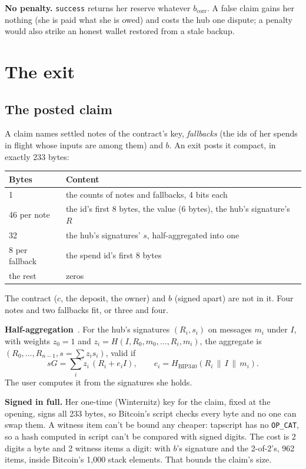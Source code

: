 \documentclass[11pt]{article}
\newcommand{\bcorr}{b_{\mathrm{corr}}}
\newcommand{\tx}[1]{\texttt{#1}}
\begin{document}
\textbf{No penalty.} \tx{success} returns her reserve whatever
$\bcorr$. A false claim gains her nothing (she is paid what she is
owed) and costs the hub one dispute; a penalty would also strike an
honest wallet restored from a stale backup.

\section{The exit}\label{sec:exit}

\subsection{The posted claim}\label{sec:claim}

A claim names settled notes of the contract's key, \emph{fallbacks}
(the ids of her spends in flight whose inputs are among them) and $b$.
An exit posts it compact, in exactly 233 bytes:

\begin{center}
\begin{tabularx}{0.9\linewidth}{lL}
\toprule
Bytes & Content \\
 & the counts of notes and fallbacks, 4 bits each \\
46 per note & the id's first 8 bytes, the value (6 bytes), the hub's signature's $R$ \\
32 & the hub's signatures' $s$, half-aggregated into one \\
8 per fallback & the spend id's first 8 bytes \\
the rest & zeros \\
\bottomrule
\end{tabularx}
\end{center}

The contract ($c$, the deposit, the owner) and $b$ (signed apart) are
not in it. Four notes and two fallbacks fit, or three and four.

\textbf{Half-aggregation}~\cite{halfagg1,halfagg2}. For the hub's
signatures $(R_i, s_i)$ on messages $m_i$ under $I$, with weights
$z_0 = 1$ and $z_i = H(I, R_0, m_0, \dots, R_i, m_i)$, the aggregate is
$(R_0, \dots, R_{n-1}, s = \sum z_i s_i)$, valid if
\[
  sG = \sum_i z_i\,(R_i + e_i I),\qquad e_i = H_{\text{BIP340}}(R_i \,\|\, I \,\|\, m_i).
\]
The user computes it from the signatures she holds.

\textbf{Signed in full.} Her one-time (Winternitz) key for the claim,
fixed at the opening, signs all 233 bytes, so Bitcoin's script checks
every byte and no one can swap them. A witness item can't be bound any
cheaper: tapscript has no \tx{OP\_CAT}, so a hash computed in script
can't be compared with signed digits. The cost is 2 digits a byte and 2
witness items a digit: with $b$'s signature and the 2-of-2's, 962
items, inside Bitcoin's 1,000 stack elements. That bounds the claim's
size.
\end{document}
